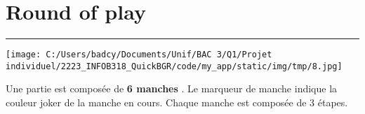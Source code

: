 \documentclass{scrartcl}%
\begin{document}
%
\sectionfont{\color{mygreen}}%
\subsectionfont{\color{mygreen}}%
\subsubsectionfont{\color{mygreen}}%
\section{ Round of play
}%
\label{sec:Roundofplay}%
\textcolor{mygreen}{\rule{18cm}{0.07cm}}\break%
%
\begin{center}\texttt{[image: C:/Users/badcy/Documents/Unif/BAC 3/Q1/Projet individuel/2223\_INFOB318\_QuickBGR/code/my\_app/static/img/tmp/8.jpg]}\end{center}%

%
Une partie est composée de %
\textcolor{mygreen}{%
\textbf{6 manches}%
}%
. Le marqueur de manche indique la couleur joker de la manche en cours. Chaque manche est composée de 3 étapes.


%
\end{document}
